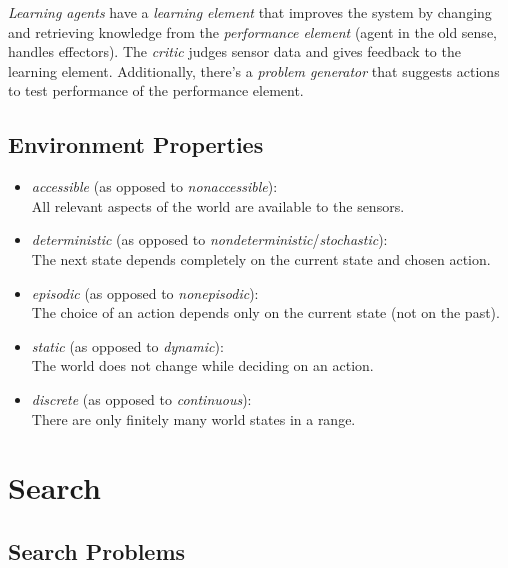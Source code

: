 \documentclass[english]{panikzettel}
\begin{document}
\emph{Learning agents} have a \emph{learning element} that improves the system by changing and retrieving knowledge from the \emph{performance element} (agent in the old sense, handles effectors).
The \emph{critic} judges sensor data and gives feedback to the learning element.
Additionally, there's a \emph{problem generator} that suggests actions to test performance of the performance element.

\newpage
\subsection{Environment Properties}

\begin{itemize}
    \item \emph{accessible} (as opposed to \emph{nonaccessible}): \\
          All relevant aspects of the world are available to the sensors.
    \item \emph{deterministic} (as opposed to \emph{nondeterministic}/\emph{stochastic}): \\
          The next state depends completely on the current state and chosen action.
    \item \emph{episodic} (as opposed to \emph{nonepisodic}): \\
          The choice of an action depends only on the current state (not on the past).
    \item \emph{static} (as opposed to \emph{dynamic}): \\
          The world does not change while deciding on an action.
    \item \emph{discrete} (as opposed to \emph{continuous}): \\
          There are only finitely many world states in a range.
\end{itemize}

\section{Search}

\subsection{Search Problems}
\end{document}
